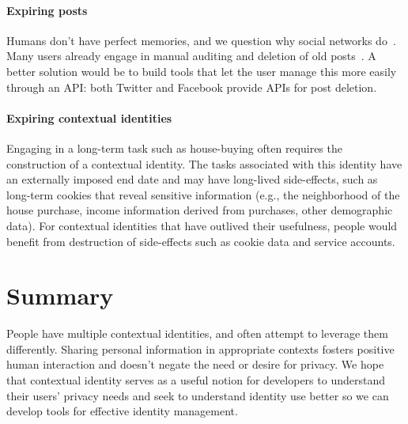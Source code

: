\documentclass[10pt, conference, compsocconf]{IEEEtran}
\begin{document}
\paragraph{Expiring posts}
Humans don't have perfect memories, and we question why social networks
do~\cite{delete}. Many users already engage in manual auditing and
deletion of old posts~\cite{fbtips2}. A better solution would be to build tools
that let the user manage this more easily through an API: both Twitter and
Facebook provide APIs for post deletion.

\paragraph{Expiring contextual identities}
Engaging in a long-term task such as house-buying often requires the
construction of a contextual identity. The tasks associated with this identity
have an externally imposed end date and may have long-lived side-effects, such
as long-term cookies that reveal sensitive information (e.g., the neighborhood
of the house purchase, income information derived from purchases, other
demographic data). For contextual identities that have outlived their
usefulness, people would benefit from destruction of side-effects such as cookie
data and service accounts.

\section{Summary}
People have multiple contextual identities, and often attempt to leverage them differently. Sharing personal information in
appropriate contexts fosters positive human interaction and doesn't negate the need or desire for privacy. We hope that
contextual identity serves as a useful notion for developers to understand
their users' privacy needs and seek to understand identity use better so we can develop tools for effective identity management.

\begin{comment}
\section{Acknowledgments}
The authors thank
Lucas Adamski
Ben Adida
Mike Connor
Chris Karlof
\end{comment}



\end{document}
